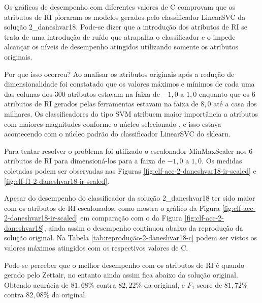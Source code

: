 			

			

			Os gráficos de desempenho com diferentes valores de C comprovam que os atributos de RI pioraram os modelos gerados pelo classificador LinearSVC da solução 2\_daneshvar18.
			Pode-se dizer que a introdução dos atributos de RI se trata de uma introdução de ruído que atrapalha o classificador e o impede alcançar os níveis de desempenho atingidos utilizando somente os atributos originais.

			Por que isso ocorreu?
			Ao analisar os atributos originais após a redução de dimensionalidade foi constatado que os valores máximos e mínimos de cada uma das colunas dos 300 atributos estavam na faixa de $-1,0$ a $1,0$ enquanto que os 6 atributos de RI gerados pelas ferramentas estavam na faixa de $8,0$ até a casa dos milhares.
			Os classificadores do tipo SVM atribuem maior importância a atributos com maiores magnitudes conforme o núcleo selecionado \cite{Kumar2014}, e isso estava acontecendo com o núcleo padrão do classificador LinearSVC do sklearn.

			Para tentar resolver o problema foi utilizado o escalonador MinMaxScaler nos 6 atributos de RI para dimensioná-los para a faixa de $-1,0$ a $1,0$. 
			Os medidas coletadas podem ser observadas nas Figuras \ref{fig:clf-acc-2-daneshvar18-ir-scaled} e \ref{fig:clf-f1-2-daneshvar18-ir-scaled}. 

			

			

			Apesar do desempenho do classificador da solução 2\_daneshvar18 ter sido maior com os atributos de RI escalonados, como mostra o gráfico da Figura \ref{fig:clf-acc-2-daneshvar18-ir-scaled} em comparação com o da Figura \ref{fig:clf-acc-2-daneshvar18}, ainda assim o desempenho continuou abaixo da reprodução da solução original.
			Na Tabela \ref{tab:reprodução-2-daneshvar18-c} podem ser vistos os valores máximos atingidos com os respectivos valores de C.

			

			Pode-se perceber que o melhor desempenho com os atributos de RI é quando gerado pelo Zettair, no entanto ainda assim fica abaixo da solução original.
			Obtendo acurácia de $81,68\%$ contra $82,22\%$ da original, e $F_1$-score de $81,72\%$ contra $82,08\%$ da original.




